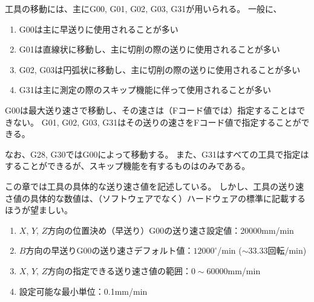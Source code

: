 

工具の移動には、主に{\ttfamily G00}, {\ttfamily G01}, {\ttfamily G02}, {\ttfamily G03}, {\ttfamily G31}が用いられる。
一般に、
\begin{enumerate}[label=\sarrow]
\item {\ttfamily G00}は主に早送りに使用されることが多い
\item {\ttfamily G01}は直線状に移動し、主に切削の際の送りに使用されることが多い
\item {\ttfamily G02}, {\ttfamily G03}は円弧状に移動し、主に切削の際の送りに使用されることが多い
\item {\ttfamily G31}は主に測定の際のスキップ機能に伴って使用されることが多い
\end{enumerate}
{\ttfamily G00}は最大送り速さで移動し、その速さは（Fコード値では）指定することはできない。
{\ttfamily G01}, {\ttfamily G02}, {\ttfamily G03}, {\ttfamily G31}はその送りの速さをFコード値で指定することができる。

なお、{\ttfamily G28}, {\ttfamily G30}では{\ttfamily G00}によって移動する。
また、{\ttfamily G31}はすべての工具で指定はすることができるが、スキップ機能を有するものは\TouchSensorProbe のみである。
\begin{marker}
この章では工具の具体的な送り速さ値を記述している。
しかし、工具の送り速さ値の具体的な数値は、（ソフトウェアでなく）ハードウェアの標準に記載するほうが望ましい。
\end{marker}



\begin{enumerate}[label=\sarrow]
\item $X$, $Y$, $Z$方向の位置決め（早送り）{\ttfamily G00}の送り速さ設定値：20000mm/min
\item $B$方向の早送り{\ttfamily G00}の送り速さデフォルト値：$12000^\circ$/min ($\sim 33.33$回転/min)
\item $X$, $Y$, $Z$方向の指定できる送り速さ値の範囲：$0\sim60000$mm/min
\item 設定可能な最小単位：0.1mm/min
\end{enumerate}



